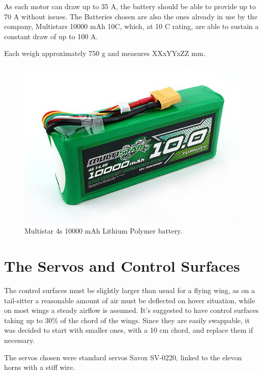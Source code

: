 As each motor can draw up to 35 A, the battery should be able to provide up to 70 A without issues.
The Batteries chosen are also the ones already in use by the company, Multistars 10000 mAh 10C, which, at 10 C rating, are able to sustain a constant draw of up to 100 A. 

Each weigh approximately 750 g and measures XXxYYxZZ mm.

\begin{figure}[H]
\centering
  \includegraphics[width=0.8\linewidth]{figs/battery.jpg}
  \caption{Multistar 4s 10000 mAh Lithium Polymer battery.}
  \label{fig:yaw_loop}
\end{figure}


\section{The Servos and Control Surfaces}

The control surfaces must be slightly larger than usual for a flying wing, as on a tail-sitter a reasonable amount of air must be deflected on hover situation, while on most wings a steady airflow is assumed. It's suggested to have control surfaces taking up to 30\% of the chord of the wings. Since they are easily swappable, it was decided to start with smaller ones, with a 10 cm chord, and replace them if necessary.


The servos chosen were standard servos Savox SV-0220, linked to the elevon horns with a stiff wire. 

